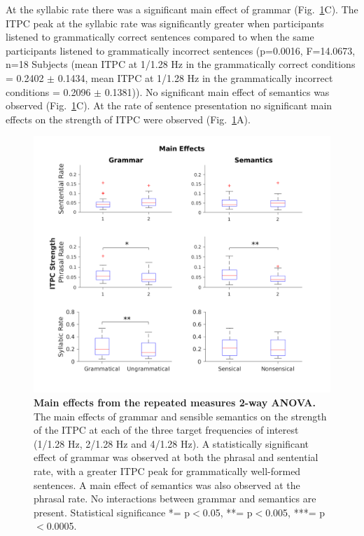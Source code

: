 \documentclass[a4paper,10pt,twoside]{article}
\begin{document}
At the syllabic rate there was a significant main effect of grammar (Fig.~\ref{MainEffects}C). The ITPC peak at the syllabic rate was significantly greater when participants listened to grammatically correct sentences compared to when the same participants listened to grammatically incorrect sentences (p=0.0016, F=14.0673, n=18 Subjects (mean ITPC at 1/1.28 Hz in the grammatically correct conditions = 0.2402 $\pm$ 0.1434, mean ITPC at 1/1.28 Hz in the grammatically incorrect conditions = 0.2096 $\pm$ 0.1381)). No significant main effect of semantics was observed (Fig.~\ref{MainEffects}C). At the rate of sentence presentation no significant main effects on the strength of ITPC were observed (Fig.~\ref{MainEffects}A).



\begin{figure}[tbp]
\includegraphics[width=\linewidth]{BoxPlots_main_effects.png}
\caption{\textbf{Main effects from the repeated measures 2-way ANOVA.} The main effects of grammar and sensible semantics on the strength of the ITPC at each of the three target frequencies of interest (1/1.28 Hz, 2/1.28 Hz and 4/1.28 Hz). A statistically significant effect of grammar was observed at both the phrasal and sentential rate, with a greater ITPC peak for grammatically well-formed sentences. A main effect of semantics was also observed at the phrasal rate. No interactions between grammar and semantics are present. Statistical significance *= p$<$0.05, **= p$<$0.005, ***= p$<$0.0005.}
\label{MainEffects}
\end{figure}
\end{document}
